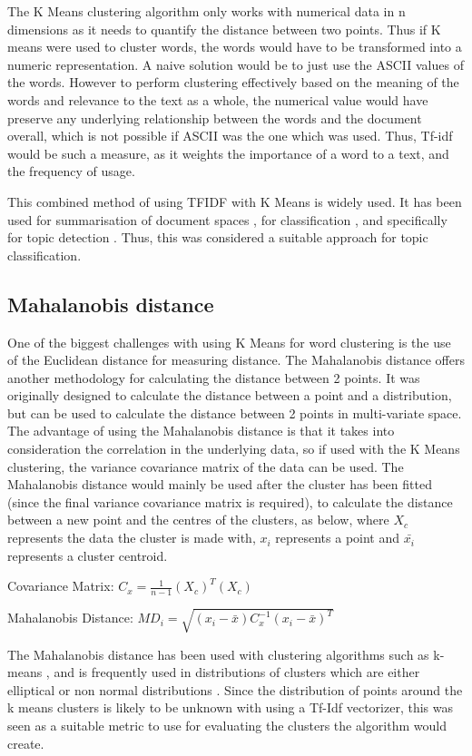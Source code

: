 The K Means clustering algorithm only works with numerical data in n dimensions as it needs to quantify the distance between two points. Thus if K means were used to cluster words, the words would have to be transformed into a numeric representation. A naive solution would be to just use the ASCII values of the words. However to perform clustering effectively based on the meaning of the words and relevance to the text as a whole, the numerical value would have preserve any underlying relationship between the words and the document overall, which is not possible if ASCII was the one which was used. Thus, Tf-idf would be such a measure, as it weights the importance of a word to a text, and the frequency of usage. 

This combined method of using TFIDF with K Means is widely used. It has been used for summarisation of document spaces \cite{khan2019extractive}, for classification \cite{buana2012combination}, and specifically for topic detection \cite{6066301}. Thus, this was considered a suitable approach for topic classification.

\subsection{Mahalanobis distance}
One of the biggest challenges with using K Means for word clustering is the use of the Euclidean distance for measuring distance. The Mahalanobis distance offers another methodology for calculating the distance between 2 points. It was originally designed to calculate the distance between a point and a distribution, but can be used to calculate the distance between 2 points in multi-variate space. The advantage of using the Mahalanobis distance is that it takes into consideration the correlation in the underlying data, so if used with the K Means clustering, the variance covariance matrix of the data can be used. The Mahalanobis distance would mainly be used after the cluster has been fitted (since the final variance covariance matrix is required), to calculate the distance between a new point and the centres of the clusters, as below, where $X_{c}$ represents the data the cluster is made with, $x_{i}$ represents a point and $\bar{x_{i}}$ represents a cluster centroid.  

\begin{center}
	Covariance Matrix:
	$C_{x} = \frac{1}{n - 1} (X_{c}) ^T (X_{c})$
	
	Mahalanobis Distance:
	$MD_{i} = \sqrt{(x_{i}  -  \bar{ x  } ) C_{x}^{-1} ( x_{i}   - \bar{ x  }  )^T    }  $
\end{center}

The Mahalanobis distance has been used with clustering algorithms such as k-means \cite{melnykov2014k} \cite{cerioli2005k}, and is frequently used in distributions of clusters which are either elliptical \cite{mitchell1985mahalanobis} or non normal distributions \cite{warren2011use}. Since the distribution of points around the k means clusters is likely to be unknown with using a Tf-Idf vectorizer, this was seen as a suitable metric to use for evaluating the clusters the algorithm would create.